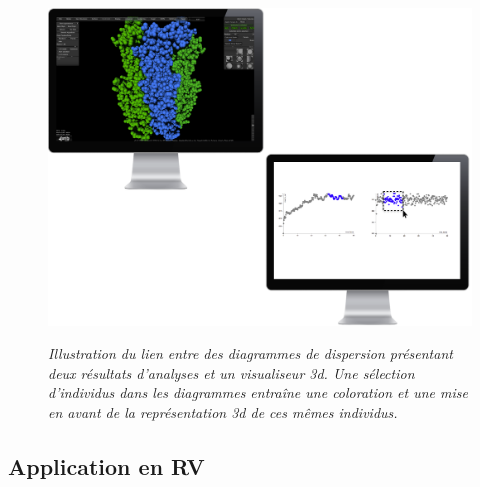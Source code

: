 \begin{figure}
  \centering
  {\includegraphics[width=.75\linewidth]{./figures/ch4/ch4_visu2d_visu3d_link.pdf}}
    \caption{\it Illustration du lien entre des diagrammes de dispersion présentant deux résultats d'analyses et un visualiseur 3d. Une sélection d'individus dans les diagrammes entraîne une coloration et une mise en avant de la représentation 3d de ces mêmes individus.}
  \label{Fig:bilateral_selection}
  \hspace{0.3cm}
\end{figure}

\subsection{Application en RV}

